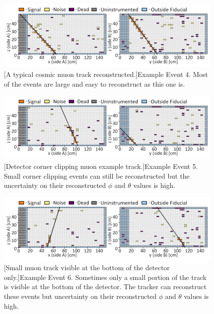 \begin{figure}[htbp]
 \centering
 \includegraphics[width=\linewidth]{Appendix6/Figs/wylfaEg4MedText.png}
 [A typical cosmic muon track reconstructed.]{Example Event 4. Most of the events are large and easy to reconstruct as this one is.} 
 \label{fig:wylfaEg4}
\end{figure}

\begin{figure}[htbp]
 \centering
 \includegraphics[width=\linewidth]{Appendix6/Figs/wylfaEg5MedText.png}
 [Detector corner clipping muon example track.]{Example Event 5. Small corner clipping events can still be reconstructed but the uncertainty on their reconstructed $\phi$ and $\theta$ values is high.} 
 \label{fig:wylfaEg5}
\end{figure}

\begin{figure}[htbp]
 \centering
 \includegraphics[width=\linewidth]{Appendix6/Figs/wylfaEg6MedText.png}
 [Small muon track visible at the bottom of the detector only.]{Example Event 6. Sometimes only a small portion of the track is visible at the bottom of the detector. The tracker can reconstruct these events but uncertainty on their reconstructed $\phi$ and $\theta$ values is high.} 
 \label{fig:wylfaEg6}
\end{figure}
